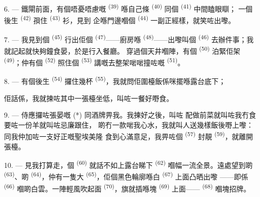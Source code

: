 6. --- 鐵閘前面，有個唔憂唔慮嘅 \textsuperscript{(39)} 喺自己條
 \textsuperscript{(40)} 同個 \textsuperscript{(41)} 中間瞌眼瞓；
一個後生 \textsuperscript{(42)} 孭住 \textsuperscript{(43)} 衫，見到
企喺門邊嗰個 \textsuperscript{(44)} 一副正經樣，就笑咗出嚟。

7. --- 我見到個 \textsuperscript{(45)} 行出佢個
\textsuperscript{(47)}——廚房喺 \textsuperscript{(48)}——出嚟叫個
 \textsuperscript{(46)} 去辦件事；我就記起就快夠鐘食晏，於是行入餐廳。
穿過個天井嗰陣，有個 \textsuperscript{(50)} 泊緊佢架
\textsuperscript{(49)}；仲有個 \textsuperscript{(52)} 照住個
\textsuperscript{(53)} 講嘅去整架啱啱撞咗嘅 \textsuperscript{(51)}。

8. --- 有個後生 \textsuperscript{(54)} 攞住幾杯
\textsuperscript{(55)}，我就問佢圍檯飯係咪擺喺露台底下；


佢話係，我就揀咗其中一張檯坐低，叫咗一餐好嘢食。

\VUsaut{4.0mm}
\VUsaut{3.0mm}

9. --- 侍應攞咗張晏嘅 (*) 同酒牌畀我。我揀好之後，叫咗
配做前菜就叫咗我冇食
要咗一份羊就叫咗忌廉跟住，
啲冇一款啱我心水，我就叫人送幾樣飯後嘢上嚟：
同我仲加咗一支好正嘅聖埃美隆
食到心滿意足，我畀咗個 \textsuperscript{(57)} 封靚
\textsuperscript{(59)}，就離開張檯。

10. --- 見我打算走，個 \textsuperscript{(60)} 就話不如上露台睇下
 \textsuperscript{(62)} 嗰幅一流全景。遠處望到啲
\textsuperscript{(63)}、啲 \textsuperscript{(64)}，仲有一隻大
\textsuperscript{(65)}，佢個黑色輪廓喺白 \textsuperscript{(67)} 上面凸晒出嚟
——即係 \textsuperscript{(66)} 嗰啲白雲。一陣輕風吹起面
\textsuperscript{(70)}，旗就插喺塊 \textsuperscript{(69)} 上面——
\textsuperscript{(68)} 嗰塊招牌。

